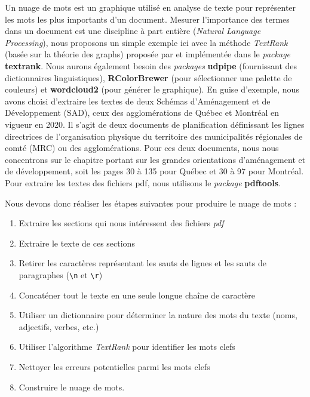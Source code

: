 \documentclass[
  11pt,
  french,
]{book}
\providecommand{\tightlist}{%
  \setlength{\itemsep}{0pt}\setlength{\parskip}{0pt}}
\begin{document}
Un nuage de mots est un graphique utilisé en analyse de texte pour représenter les mots les plus importants d'un document. Mesurer l'importance des termes dans un document est une discipline à part entière (\emph{Natural Language Processing}), nous proposons un simple exemple ici avec la méthode \emph{TextRank} (basée sur la théorie des graphs) proposée par \citet{mihalcea2004textrank} et implémentée dans le \emph{package} \textbf{textrank}. Nous aurons également besoin des \emph{packages} \textbf{udpipe} (fournissant des dictionnaires linguistiques), \textbf{RColorBrewer} (pour sélectionner une palette de couleurs) et \textbf{wordcloud2} (pour générer le graphique). En guise d'exemple, nous avons choisi d'extraire les textes de deux Schémas d'Aménagement et de Développement (SAD), ceux des agglomérations de Québec et Montréal en vigueur en 2020. Il s'agit de deux documents de planification définissant les lignes directrices de l'organisation physique du territoire des municipalités régionales de comté (MRC) ou des agglomérations. Pour ces deux documents, nous nous concentrons sur le chapitre portant sur les grandes orientations d'aménagement et de développement, soit les pages 30 à 135 pour Québec et 30 à 97 pour Montréal. Pour extraire les textes des fichiers pdf, nous utilisons le \emph{package} \textbf{pdftools}.

Nous devons donc réaliser les étapes suivantes pour produire le nuage de mots :

\begin{enumerate}
\def\labelenumi{\arabic{enumi}.}
\tightlist
\item
  Extraire les sections qui nous intéressent des fichiers \emph{pdf}
\item
  Extraire le texte de ces sections
\item
  Retirer les caractères représentant les sauts de lignes et les sauts de paragraphes (\texttt{\textbackslash{}n} et \texttt{\textbackslash{}r})
\item
  Concaténer tout le texte en une seule longue chaîne de caractère
\item
  Utiliser un dictionnaire pour déterminer la nature des mots du texte (noms, adjectifs, verbes, etc.)
\item
  Utiliser l'algorithme \emph{TextRank} pour identifier les mots clefs
\item
  Nettoyer les erreurs potentielles parmi les mots clefs
\item
  Construire le nuage de mots.
\end{enumerate}
\end{document}
